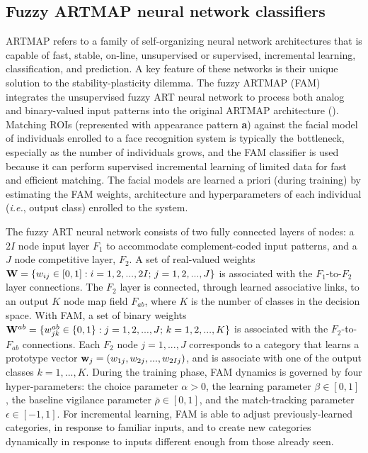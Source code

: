\subsection{Fuzzy ARTMAP neural network classifiers}
\label{sec:c3_fam}

ARTMAP refers to a family of self-organizing neural network architectures that is capable of fast, stable, on-line, unsupervised or supervised, incremental learning, classification, and prediction.
A key feature of these networks is their unique solution to the stability-plasticity dilemma.
The fuzzy ARTMAP (FAM) integrates the unsupervised fuzzy ART neural network to process both analog and binary-valued input patterns into the original ARTMAP architecture (\cite{carpenter92}).
Matching ROIs (represented with appearance pattern \textbf{a}) against the facial model of individuals enrolled to a face recognition system is typically the bottleneck, especially as the number of individuals grows, and the FAM classifier is used because it can perform supervised incremental learning of limited data for fast and efficient matching.
The facial models are learned a priori (during training) by estimating the FAM weights, architecture and hyperparameters of each individual (\emph{i.e.}, output class) enrolled to the system. 

The fuzzy ART neural network consists of two fully connected layers of nodes: a $2I$ node input layer $F_1$ to accommodate complement-coded input patterns, and a $J$ node competitive layer, $F_2$.
A set of real-valued weights ${\bf W} = \{w_{ij} \in [0,1] : i = 1, 2, ..., 2I;\, j = 1, 2, ..., J\}$ is associated with the $F_1$-to-$F_2$ layer connections.
The $F_2$ layer is connected, through learned associative links, to an output $K$ node map field $F_{ab}$, where $K$ is the number of classes in the decision space.
With FAM, a set of binary weights ${\bf W}^{ab} = \{w^{ab}_{jk} \in \{0,1\} : j = 1, 2, ..., J;\, k = 1, 2, ..., K\}$ is associated with the $F_2$-to-$F_{ab}$ connections.
Each $F_2$ node $j = 1, ... , J$ corresponds to a category that learns a prototype vector ${\bf w}_j = (w_{1j}, w_{2j},..., w_{2Ij})$, and is associate with one of the output classes $k=1,...,K$.
During the training phase, FAM dynamics is governed by four hyper-parameters: the choice parameter $\alpha>0$, the learning parameter $\beta \in \left[ 0,1 \right]$, the baseline vigilance parameter $\bar{\rho} \in \left[ 0,1 \right]$, and the match-tracking parameter $\epsilon  \in [-1,1]$.
For incremental learning, FAM is able to adjust previously-learned categories, in response to familiar inputs, and to create new categories dynamically in response to inputs different enough from those already seen.

